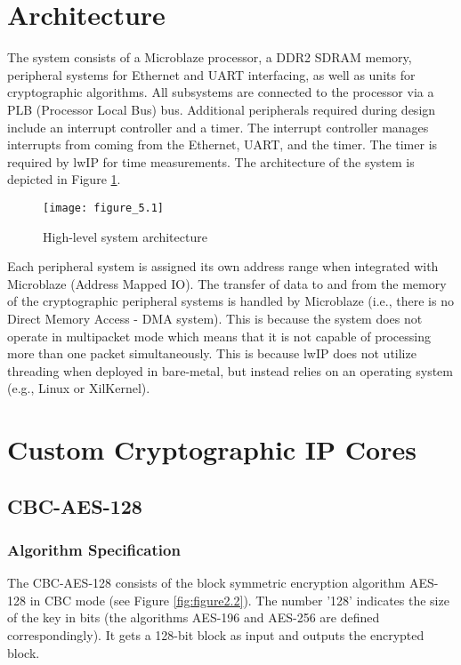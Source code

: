 
\section{Architecture}
The system consists of a Microblaze processor, a DDR2 SDRAM memory, peripheral systems for Ethernet and UART interfacing, as well as units for cryptographic algorithms. All subsystems are connected to the processor via a PLB (Processor Local Bus) bus. Additional peripherals required during design include an interrupt controller and a timer. The interrupt controller manages interrupts from coming from the Ethernet, UART, and the timer. The timer is required by lwIP for time measurements. The architecture of the system is depicted in Figure \ref{fig:figure_5.1}.

\begin{figure}[H]
\centering
\texttt{[image: figure\_5.1]}\\
\caption{ High-level system architecture }
\label{fig:figure_5.1}
\end{figure}

Each peripheral system is assigned its own address range when integrated with Microblaze (Address Mapped IO). The transfer of data to and from the memory of the cryptographic peripheral systems is handled by Microblaze (i.e., there is no Direct Memory Access - DMA system). This is because the system does not operate in multipacket mode which means that it is not capable of processing more than one packet simultaneously. This is because lwIP does not utilize threading when deployed in bare-metal, but instead relies on an operating system (e.g., Linux or XilKernel).

\section{Custom Cryptographic IP Cores}
\subsection{CBC-AES-128}
\subsubsection*{Algorithm Specification}
The CBC-AES-128 consists of the block symmetric encryption algorithm AES-128 in CBC mode (see Figure \ref{fig:figure2.2}). The number '128' indicates the size of the key in bits (the algorithms AES-196 and AES-256 are defined correspondingly). It gets a 128-bit block as input and outputs the encrypted block.

